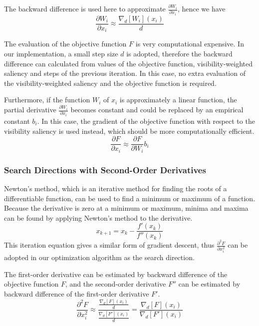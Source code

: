 The backward difference is used here to approximate $ \frac{\partial W_{i}}{\partial x_{i}} $, hence we have
\[ \frac{\partial W_{i}}{\partial x_{i}} \approx \frac{\nabla_{d}[W_{i}](x_{i})}{d} \]

The evaluation of the objective function $ F $ is very computational expensive. In our implementation, a small step size $ d $ is adopted, therefore the backward difference can calculated from values of the objective function, visibility-weighted saliency and steps of the previous iteration. In this case, no extra evaluation of the visibility-weighted saliency and the objective function is required.

Furthermore, if the function $ W_{i} $ of $ x_{i} $ is approximately a linear function, the partial derivative $ \frac{\partial W_{i}}{\partial x_{i}} $ becomes constant and could be replaced by an empirical constant $ b_{i} $. In this case, the gradient of the objective function with respect to the visibility saliency is used instead, which should be more computationally efficient.
\[ \frac{\partial F}{\partial x_{i}} \approx \frac{\partial F}{\partial W_{i}} b_{i} \]

\subsubsection{Search Directions with Second-Order Derivatives}
Newton's method, which is an iterative method for finding the roots of a differentiable function, can be used to find a minimum or maximum of a function. Because the derivative is zero at a minimum or maximum, minima and maxima can be found by applying Newton's method to the derivative.
\[ x_{k+1}=x_{k}- \frac{f'(x_{k})}{f''(x_{k})} \]
This iteration equation gives a similar form of gradient descent, thus $ \frac{\partial^2 F}{\partial x_{i}^2} $ can be adopted in our optimization algorithm as the search direction.

The first-order derivative can be estimated by backward difference of the objective function $ F $, and the second-order derivative $ F'' $ can be estimated by backward difference of the first-order derivative $ F' $.
\[ \frac{\partial^2 F}{\partial x_{i}^2} 
\approx \dfrac{ \frac{\nabla_{d}[F](x_{i})}{d} }{ \frac{\nabla_{d}[F'](x_{i})}{d} }
= \frac{ \nabla_{d}[F](x_{i}) }{ \nabla_{d}[F'](x_{i}) } \]

